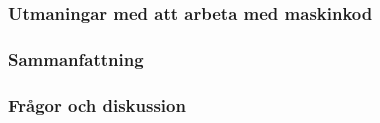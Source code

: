 \begin{frame}[fragile,t]
    \frametitle{Utmaningar med att arbeta med maskinkod}


\end{frame}

\begin{frame}[fragile,t]
    \frametitle{Sammanfattning}


\end{frame}

\begin{frame}[fragile,t]
    \frametitle{Frågor och diskussion}


\end{frame}